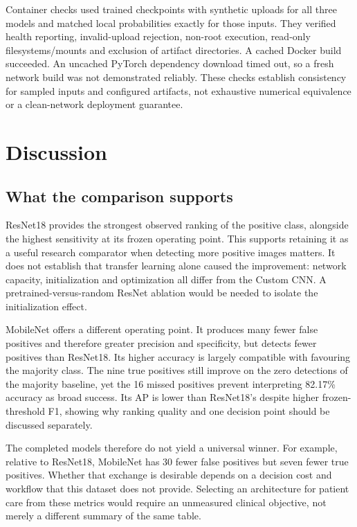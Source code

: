\documentclass[11pt,a4paper]{article}
\begin{document}
Container checks used trained checkpoints with synthetic uploads for all three models and matched local probabilities exactly for those inputs. They verified health reporting, invalid-upload rejection, non-root execution, read-only filesystems/mounts and exclusion of artifact directories. A cached Docker build succeeded. An uncached PyTorch dependency download timed out, so a fresh network build was not demonstrated reliably. These checks establish consistency for sampled inputs and configured artifacts, not exhaustive numerical equivalence or a clean-network deployment guarantee.

\section{Discussion}
\subsection{What the comparison supports}
ResNet18 provides the strongest observed ranking of the positive class, alongside the highest sensitivity at its frozen operating point. This supports retaining it as a useful research comparator when detecting more positive images matters. It does not establish that transfer learning alone caused the improvement: network capacity, initialization and optimization all differ from the Custom CNN. A pretrained-versus-random ResNet ablation would be needed to isolate the initialization effect.

MobileNet offers a different operating point. It produces many fewer false positives and therefore greater precision and specificity, but detects fewer positives than ResNet18. Its higher accuracy is largely compatible with favouring the majority class. The nine true positives still improve on the zero detections of the majority baseline, yet the 16 missed positives prevent interpreting 82.17\% accuracy as broad success. Its AP is lower than ResNet18's despite higher frozen-threshold F1, showing why ranking quality and one decision point should be discussed separately.

The completed models therefore do not yield a universal winner. For example, relative to ResNet18, MobileNet has 30 fewer false positives but seven fewer true positives. Whether that exchange is desirable depends on a decision cost and workflow that this dataset does not provide. Selecting an architecture for patient care from these metrics would require an unmeasured clinical objective, not merely a different summary of the same table.
\end{document}
